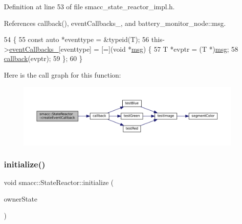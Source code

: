 Definition at line 53 of file smacc\+\_\+state\+\_\+reactor\+\_\+impl.\+h.



References callback(), event\+Callbacks\+\_\+, and battery\+\_\+monitor\+\_\+node\+::msg.


\begin{DoxyCode}
54 \{
55     \textcolor{keyword}{const} \textcolor{keyword}{auto} *eventtype = &\textcolor{keyword}{typeid}(T);
56     this->\hyperlink{classsmacc_1_1StateReactor_a63cce05c412f3699cc1b15af9aeaf8af}{eventCallbacks\_}[eventtype] = [=](\textcolor{keywordtype}{void} *\hyperlink{namespacebattery__monitor__node_ab1920c64448816edd4064e494275fdff}{msg}) \{
57         T *evptr = (T *)\hyperlink{namespacebattery__monitor__node_ab1920c64448816edd4064e494275fdff}{msg};
58         \hyperlink{servers_2opencv__perception__node_2opencv__perception__node_8cpp_a050e697bd654facce10ea3f6549669b3}{callback}(evptr);
59     \};
60 \}
\end{DoxyCode}
Here is the call graph for this function\+:
\nopagebreak
\begin{figure}[H]
\begin{center}
\leavevmode
\includegraphics[width=350pt]{classsmacc_1_1StateReactor_ac6b3a604009e5a68123aed27e70cf2be_cgraph}
\end{center}
\end{figure}
\mbox{\label{classsmacc_1_1StateReactor_a5c1d734e3a495fa0f2b01229a3dbac3f}} 
\subsubsection{\texorpdfstring{initialize()}{initialize()}}
{\footnotesize\ttfamily void smacc\+::\+State\+Reactor\+::initialize (\begin{DoxyParamCaption}\item[{\hyperlink{classsmacc_1_1ISmaccState}{smacc\+::\+I\+Smacc\+State} $\ast$}]{owner\+State }\end{DoxyParamCaption})}



